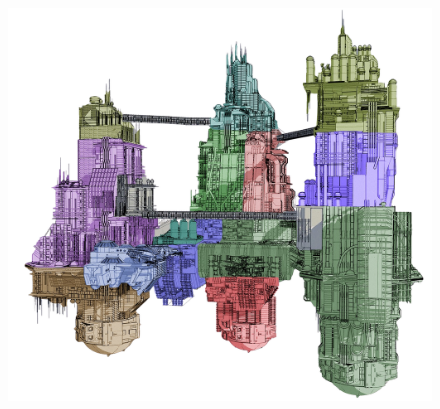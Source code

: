 \newsect

\newpage

\begin{figure}
    \centering
    \includegraphics[width=1.0\textwidth]{img/bg/station.png}
    \label{fig:refinery}
\end{figure}

\newpage